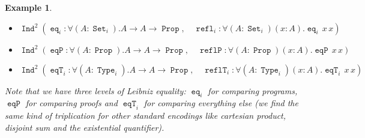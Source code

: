 \documentclass[a4paper,USenglish]{lipics}
\newtheorem{exm}{Example}
\DeclareMathOperator{\Prop}{\mathtt{Prop}}
\DeclareMathOperator{\Type}{\mathtt{Type}}
\DeclareMathOperator{\Set}{\mathtt{Set}}
\DeclareMathOperator{\Ind}{\mathtt{Ind}}
\DeclareMathOperator{\Nat}{\mathtt{nat}}
\DeclareMathOperator{\Succ}{\mathtt{S}}
\DeclareMathOperator{\Or}{\mathtt{or}}
\DeclareMathOperator{\Right}{\mathtt{right}}
\DeclareMathOperator{\Even}{\mathtt{even}}
\DeclareMathOperator{\Eq}{\mathtt{eq}}
\DeclareMathOperator{\EqP}{\mathtt{eqP}}
\DeclareMathOperator{\ReflP}{\mathtt{reflP}}
\DeclareMathOperator{\EqT}{\mathtt{eqT}}
\DeclareMathOperator{\ReflT}{\mathtt{reflT}}
\DeclareMathOperator{\Refl}{\mathtt{refl}}
\begin{document}
\begin{exm}
\begin{itemize}
\begin{comment}
                               &\Right :∀(A\,B:\Prop).B → \Or\,A\,B) ∈ \E\end{aligned}$
  \item $\begin{aligned}\Ind^0(&\Even : \Nat → \Prop, \\
                               &\Even\_0: \Even\,0\\
                               &\Even\_\Succ: ∀(y:\Nat).\Even\,y → \Even\,(\Succ\,(\Succ\,y))) \end{aligned}$
\end{comment}
 \item $\Ind^2(\Eq_i : ∀(A:\Set_i).A → A → \Prop, \quad \Refl_i:  ∀(A:\Set_i)(x:A).\Eq_i\,x\,x)$
 \item $\Ind^2(\EqP : ∀(A:\Prop).A → A → \Prop, \quad \ReflP:  ∀(A:\Prop)(x:A).\EqP \,x\,x)$
 \item $\Ind^2(\EqT_i : ∀(A:\Type_i).A → A → \Prop, \quad \ReflT_i:  ∀(A:\Type_i)(x:A).\EqT_i \,x\,x)$
 \end{itemize}

Note that we have three levels of Leibniz equality: $\Eq_i$ for comparing
programs, $\EqP$ for comparing proofs and $\EqT_i$ for comparing everything
else (we find the same kind of triplication for other standard encodings like
cartesian product, disjoint sum and the existential quantifier).
\end{exm}
\end{document}
